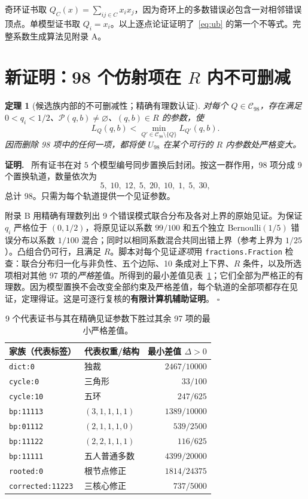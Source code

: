 \documentclass[11pt,a4paper]{ctexart}
\newtheorem{theorem}{定理}[section]
\theoremstyle{definition}
\newenvironment{proofcn}{\par\noindent\textbf{证明.}\ }{\hfill$\square$\par}
\newcommand{\calP}{\mathcal P}
\newcommand{\calC}{\mathcal C}
\begin{document}
奇环证书取 $Q_C(x)=\sum_{ij\in C}x_ix_j$，因为奇环上的多数错误必包含一对相邻错误顶点。单模型证书取 $Q_i=x_i$。以上逐点论证证明了~\eqref{eq:ub} 的第一个不等式。完整系数生成算法见附录 A。

\section{新证明：98 个仿射项在 $R$ 内不可删减}
\begin{theorem}[候选族内部的不可删减性；精确有理数认证]\label{thm:irred}
对每个 $Q\in\calC_{98}$，存在满足 $0<q_i<1/2$、$\calP(q,b)\ne\varnothing$、$(q,b)\in R$ 的参数，使
\begin{equation}\label{eq:strict}
L_Q(q,b)<\min_{Q'\in\calC_{98}\setminus\{Q\}}L_{Q'}(q,b).
\end{equation}
因而删除 98 项中的任何一项，都将使 $U_{98}$ 在某个可行的 $R$ 内参数处严格变大。
\end{theorem}
\begin{proofcn}
所有证书在对 $5$ 个模型编号同步置换后封闭。按这一群作用，98 项分成 9 个置换轨道，数量依次为
\[
5,\;10,\;12,\;5,\;20,\;10,\;1,\;5,\;30,
\]
总计 98。只需为每个轨道提供一个见证参数。

附录 B 用精确有理数列出 9 个错误模式联合分布及各对上界的原始见证。为保证 $q_i$ 严格位于 $(0,1/2)$，将原见证以系数 $99/100$ 和五个独立 Bernoulli$(1/5)$ 错误分布以系数 $1/100$ 混合；同时以相同系数混合共同出错上界（参考上界为 $1/25$）。凸组合仍可行，且满足 $R$。脚本对每个见证\emph{逐项}用 \texttt{fractions.Fraction} 检查：联合分布归一化与非负性、五个边际、10 条成对上下界、$R$ 条件，以及所选项相对其他 97 项的\emph{严格}差值。所得到的最小差值见表~\ref{tab:witness}；它们全部为严格正的有理数。因为模型置换不会改变全部约束及严格差值，每个轨道的全部项都存在见证，定理得证。这是可逐行复核的\textbf{有限计算机辅助证明}。
\end{proofcn}
\begin{table}[ht]
\centering\small
\caption{9 个代表证书与其在精确见证参数下胜过其余 97 项的最小严格差值。}\label{tab:witness}
\begin{tabular}{@{}llr@{}}
\toprule
家族（代表标签） & 代表权重/结构 & 最小差值 $\Delta>0$\\\midrule
\texttt{dict:0} & 独裁 & $2467/10000$\\
\texttt{cycle:0} & 三角形 & $33/100$\\
\texttt{cycle:10} & 五环 & $247/625$\\
\texttt{bp:11113} & $(3,1,1,1,1)$ & $1389/10000$\\
\texttt{bp:01112} & $(2,1,1,1,0)$ & $539/2500$\\
\texttt{bp:11122} & $(2,2,1,1,1)$ & $116/625$\\
\texttt{bp:11111} & 五人普通多数 & $4399/20000$\\
\texttt{rooted:0} & 根节点修正 & $1814/24375$\\
\texttt{corrected:11223} & 三核心修正 & $737/5000$\\
\bottomrule
\end{tabular}
\end{table}
\end{document}
